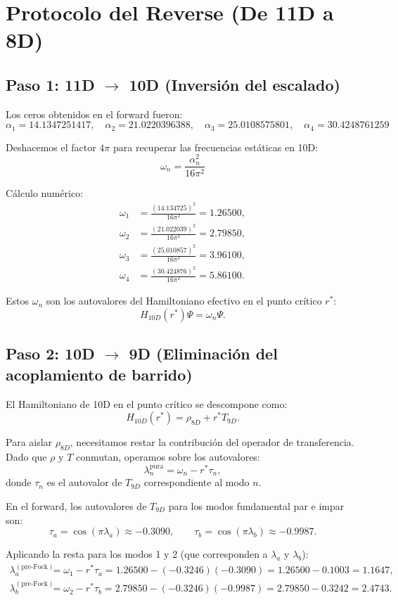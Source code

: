 \documentclass[12pt,a4paper]{article}
\begin{document}
\section{Protocolo del Reverse (De 11D a 8D)}

\subsection{Paso 1: 11D $\to$ 10D (Inversión del escalado)}
Los ceros obtenidos en el forward fueron:
\[
\alpha_1 = 14.1347251417,\quad \alpha_2 = 21.0220396388,\quad \alpha_3 = 25.0108575801,\quad \alpha_4 = 30.4248761259
\]

Deshacemos el factor \(4\pi\) para recuperar las frecuencias estáticas en 10D:
\[
\omega_n = \frac{\alpha_n^2}{16\pi^2}
\]

Cálculo numérico:
\begin{align*}
\omega_1 &= \frac{(14.134725)^2}{16\pi^2} = 1.26500, \\
\omega_2 &= \frac{(21.022039)^2}{16\pi^2} = 2.79850, \\
\omega_3 &= \frac{(25.010857)^2}{16\pi^2} = 3.96100, \\
\omega_4 &= \frac{(30.424876)^2}{16\pi^2} = 5.86100.
\end{align*}

Estos \(\omega_n\) son los autovalores del Hamiltoniano efectivo en el punto crítico \(r^*\):
\[
H_{10D}(r^*) \Psi = \omega_n \Psi.
\]

\subsection{Paso 2: 10D $\to$ 9D (Eliminación del acoplamiento de barrido)}
El Hamiltoniano de 10D en el punto crítico se descompone como:
\[
H_{10D}(r^*) = \rho_{8D} + r^* T_{9D}.
\]

Para aislar \(\rho_{8D}\), necesitamos restar la contribución del operador de transferencia. Dado que \(\rho\) y \(T\) conmutan, operamos sobre los autovalores:
\[
\lambda_n^{\text{pura}} = \omega_n - r^* \tau_n,
\]
donde \(\tau_n\) es el autovalor de \(T_{9D}\) correspondiente al modo \(n\).

En el forward, los autovalores de \(T_{9D}\) para los modos fundamental par e impar son:
\[
\tau_a = \cos(\pi \lambda_a) \approx -0.3090, \qquad \tau_b = \cos(\pi \lambda_b) \approx -0.9987.
\]

Aplicando la resta para los modos 1 y 2 (que corresponden a \(\lambda_a\) y \(\lambda_b\)):
\begin{align*}
\lambda_a^{(\text{pre-Fock})} &= \omega_1 - r^* \tau_a = 1.26500 - (-0.3246)(-0.3090) = 1.26500 - 0.1003 = 1.1647, \\
\lambda_b^{(\text{pre-Fock})} &= \omega_2 - r^* \tau_b = 2.79850 - (-0.3246)(-0.9987) = 2.79850 - 0.3242 = 2.4743.
\end{align*}
\end{document}
